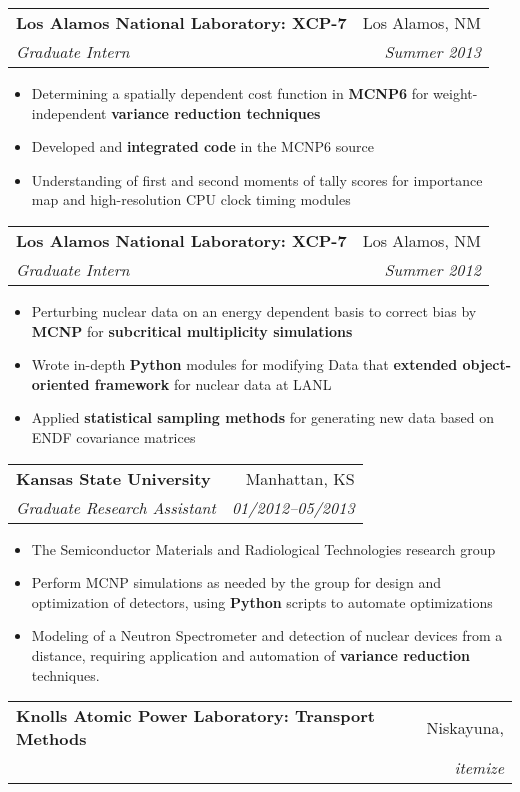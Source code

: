 \documentclass[letterpaper,11pt]{article}
\makeatletter
\newcommand{\resitem}[1]{\item #1 \vspace{-2pt}}
\newcommand{\ressubheading}[4]{
\begin{tabular*}{6.5in}{l@{\cftdotfill{\cftsecdotsep}\extracolsep{\fill}}r}
		\textbf{\hspace{-0.341in}#1} & #2 \\
		\textit{#3} & \textit{#4} \\
\end{tabular*}\vspace{-6pt}}
\makeatother
\begin{document}
 \ressubheading{Los Alamos National Laboratory: XCP-7}{Los Alamos, NM}{Graduate Intern}{Summer 2013}
	\begin{itemize}
	\resitem{Determining a spatially dependent cost function in \textbf{MCNP6} for weight-independent \textbf{variance reduction techniques}}
	\resitem{Developed and \textbf{integrated code} in the MCNP6 source}
	\resitem{Understanding of first and second moments of tally scores for importance map and high-resolution CPU clock timing modules}
	\end{itemize}
\ressubheading{Los Alamos National Laboratory: XCP-7}{Los Alamos, NM}{Graduate Intern}{Summer 2012}
	\begin{itemize}
	\resitem{Perturbing nuclear data on an energy dependent basis to correct bias by \textbf{MCNP} for \textbf{subcritical multiplicity simulations}}
	\resitem{Wrote in-depth \textbf{Python} modules for modifying Data that \textbf{extended object-oriented framework} for nuclear data at LANL}
	\resitem{Applied \textbf{statistical sampling methods} for generating new data based on ENDF covariance matrices}
	\end{itemize}
\ressubheading{Kansas State University}{Manhattan, KS}{Graduate Research Assistant}{01/2012--05/2013}
	\begin{itemize}
	\resitem{The Semiconductor Materials and Radiological Technologies research group}
	\resitem{Perform MCNP simulations as needed by the group for design and optimization of detectors, using \textbf{Python} scripts to automate optimizations}
	\resitem{Modeling of a Neutron Spectrometer and detection of nuclear devices from a distance, requiring application and automation of  \textbf{variance reduction} techniques.}
	\end{itemize}
\ressubheading{Knolls Atomic Power Laboratory: Transport Methods}{Niskayuna,
}
\end{itemize}
\end{document}
